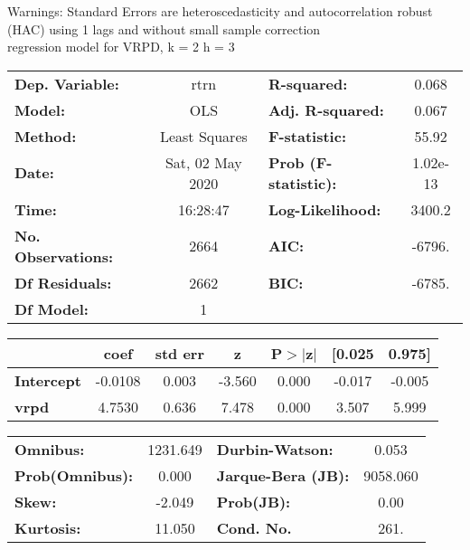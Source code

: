 Warnings: \newline
 [1] Standard Errors are heteroscedasticity and autocorrelation robust (HAC) using 1 lags and without small sample correction\\ 

regression model for VRPD, k = 2 h = 3\begin{center}
\begin{tabular}{lclc}
\toprule
\textbf{Dep. Variable:}    &       rtrn       & \textbf{  R-squared:         } &     0.068   \\
\textbf{Model:}            &       OLS        & \textbf{  Adj. R-squared:    } &     0.067   \\
\textbf{Method:}           &  Least Squares   & \textbf{  F-statistic:       } &     55.92   \\
\textbf{Date:}             & Sat, 02 May 2020 & \textbf{  Prob (F-statistic):} &  1.02e-13   \\
\textbf{Time:}             &     16:28:47     & \textbf{  Log-Likelihood:    } &    3400.2   \\
\textbf{No. Observations:} &        2664      & \textbf{  AIC:               } &    -6796.   \\
\textbf{Df Residuals:}     &        2662      & \textbf{  BIC:               } &    -6785.   \\
\textbf{Df Model:}         &           1      & \textbf{                     } &             \\
\bottomrule
\end{tabular}
\begin{tabular}{lcccccc}
                   & \textbf{coef} & \textbf{std err} & \textbf{z} & \textbf{P$> |$z$|$} & \textbf{[0.025} & \textbf{0.975]}  \\
\midrule
\textbf{Intercept} &      -0.0108  &        0.003     &    -3.560  &         0.000        &       -0.017    &       -0.005     \\
\textbf{vrpd}      &       4.7530  &        0.636     &     7.478  &         0.000        &        3.507    &        5.999     \\
\bottomrule
\end{tabular}
\begin{tabular}{lclc}
\textbf{Omnibus:}       & 1231.649 & \textbf{  Durbin-Watson:     } &    0.053  \\
\textbf{Prob(Omnibus):} &   0.000  & \textbf{  Jarque-Bera (JB):  } & 9058.060  \\
\textbf{Skew:}          &  -2.049  & \textbf{  Prob(JB):          } &     0.00  \\
\textbf{Kurtosis:}      &  11.050  & \textbf{  Cond. No.          } &     261.  \\
\bottomrule
\end{tabular}
\end{center}

